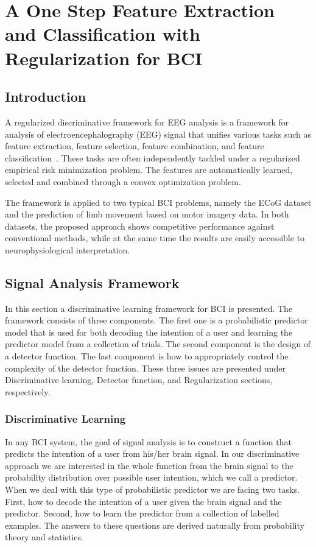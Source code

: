 \chapter{A One Step Feature Extraction and Classification with Regularization for BCI}
\section{Introduction}
A regularized discriminative framework for EEG analysis is a framework for analysis of electroencephalography (EEG) signal that unifies various tasks such as feature extraction, feature selection, feature combination, and feature classification~\cite{14}. These tasks are often independently tackled under a regularized empirical risk minimization problem. The features are automatically learned, selected and combined through a convex optimization problem. 

The framework is applied to two typical BCI problems, namely the ECoG dataset and the prediction of limb movement based on motor imagery data. In both datasets, the proposed approach shows competitive performance against conventional methods, while at the same time the results are easily accessible to neurophysiological interpretation.

\section{Signal Analysis Framework}
In this section a discriminative learning framework for BCI is presented. The framework consists of three components. The first one is a probabilistic predictor model that is used for both decoding the intention of a user and learning the predictor model from a collection of trials. The second component is the design of a detector function. The last component is how to appropriately control the complexity of the detector function. These three issues are presented under Discriminative learning, Detector function, and Regularization sections, respectively.
\subsection{Discriminative Learning}
In any BCI system, the goal of signal analysis is to construct a function that predicts the intention of a user from his/her brain signal. In our discriminative approach we are interested in the whole function from the brain signal to the probability distribution over possible user intention, which we call a predictor. When we deal with this type of probabilistic predictor we are facing two tasks. First, how to decode the intention of a user given the brain signal and the predictor. Second, how to learn the predictor from a collection of labelled examples. The answers to these questions are derived naturally from probability theory and statistics.

